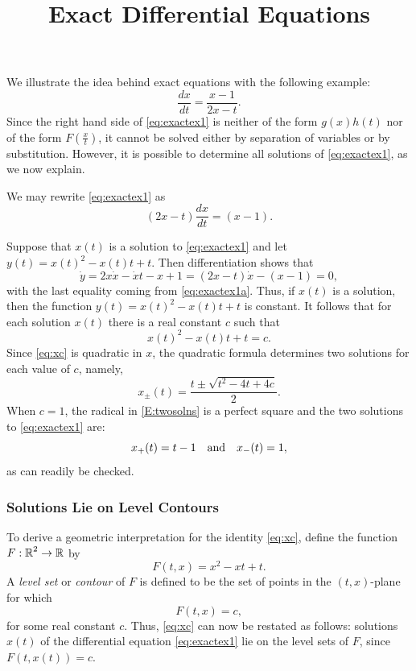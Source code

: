 \documentclass{ximera}
\title{Exact Differential Equations}
\begin{document}
\begin{abstract}
\end{abstract}
\maketitle


\label{S:exact} 

We illustrate the idea behind exact equations with the following example:
\begin{equation}  \label{eq:exactex1}
\frac{dx}{dt} = \frac{x-1}{2x-t}.
\end{equation}
Since the right hand side of \eqref{eq:exactex1} is neither of the form 
$g(x)h(t)$ nor of the form $F\left(\frac{x}{t}\right)$, it cannot be 
solved either by separation of variables or by substitution.  However, 
it is possible to determine all solutions of \eqref{eq:exactex1}, as we now 
explain.

We may rewrite \eqref{eq:exactex1} as
\begin{equation} \label{eq:exactex1a}
(2x-t)\frac{dx}{dt} =(x-1). 
\end{equation}

Suppose that $x(t)$ is a solution to \eqref{eq:exactex1} and let 
$y(t)=x(t)^2 - x(t)t + t$.  Then differentiation shows that 
\[
\dot{y} = 2x\dot{x} -\dot{x}t-x + 1 = (2x-t)\dot{x} -(x-1) =0,
\]
with the last equality coming from \eqref{eq:exactex1a}.  Thus, if $x(t)$ is a 
solution, then the function $y(t)=x(t)^2 - x(t)t + t$ is constant.  It 
follows that for each solution $x(t)$ there is a real constant $c$ such that
\begin{equation} \label{eq:xc}
x(t)^2 - x(t)t + t = c.
\end{equation}
Since \eqref{eq:xc} is quadratic in $x$, the quadratic formula determines  
two solutions for each value of $c$, namely,
\begin{equation}  \label{E:twosolns}
x_\pm(t) = \frac{t\pm\sqrt{t^2-4t+4c}}{2}.
\end{equation}
When $c=1$, the radical in \eqref{E:twosolns} is a perfect square and the 
two solutions to \eqref{eq:exactex1} are:
\[
x_+(t) = t-1 \quad\mbox{and}\quad x_-(t) = 1,
\]
as can readily be checked. 

\subsubsection*{Solutions Lie on Level Contours}

To derive a geometric interpretation for the identity \eqref{eq:xc},
define the function $F:\mbox{$\mathbb{R}$}^2\rightarrow \mbox{$\mathbb{R}$}$ by
\[
F(t,x) = x^2 - xt + t.
\]
A {\em level set\/} or 
{\em contour\/} of $F$ is defined to be
the set of points in the $(t,x)$-plane for which
\[
F(t,x) = c,
\]
for some real constant $c$.  Thus, \eqref{eq:xc} can now be restated
as follows: solutions $x(t)$ of the differential equation \eqref{eq:exactex1} 
lie on the level sets of $F$, since $F(t,x(t))=c$.
\end{document}
